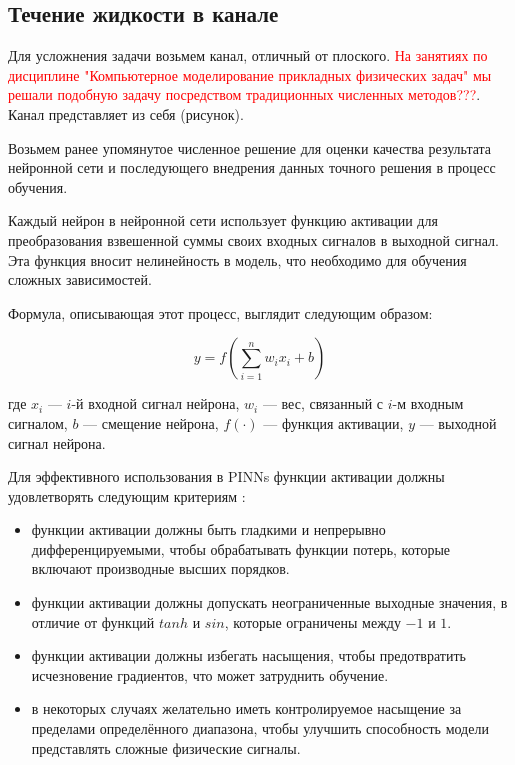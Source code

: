 \subsection{Течение жидкости в канале}
Для усложнения задачи возьмем канал, отличный от плоского. \textcolor{red}{На занятиях
по дисциплине "Компьютерное моделирование прикладных физических задач" мы решали подобную
задачу посредством традиционных численных методов???}. Канал представляет из себя (рисунок).

Возьмем ранее упомянутое численное решение для оценки качества результата нейронной сети и
последующего внедрения данных точного решения в процесс обучения.



Каждый нейрон в нейронной сети использует функцию активации для преобразования взвешенной
суммы своих входных сигналов в выходной сигнал. Эта функция вносит нелинейность в модель,
что необходимо для обучения сложных зависимостей.

Формула, описывающая этот процесс, выглядит следующим образом:

$$y = f(\sum_{i=1}^{n} w_i x_i + b)$$

где $x_i$ — $i$-й входной сигнал нейрона, $w_i$ — вес, связанный с $i$-м входным сигналом, $b$
— смещение нейрона, $f(\cdot)$ — функция активации, $y$ — выходной сигнал нейрона.

Для эффективного использования в PINNs функции активации должны удовлетворять следующим
критериям \cite{0d752c79fb816703274a3d37f85a85689a2a9405}:
\begin{itemize}
    \item функции активации должны быть гладкими и
    непрерывно дифференцируемыми, чтобы обрабатывать функции потерь, которые включают
    производные высших порядков.
    \item функции активации должны допускать неограниченные
    выходные значения, в отличие от функций $tanh$ и $sin$, которые ограничены между $-1$ и $1$.
    \item функции активации должны избегать насыщения, чтобы предотвратить
    исчезновение градиентов, что может затруднить обучение.
    \item в некоторых случаях желательно иметь контролируемое насыщение за пределами определённого
    диапазона, чтобы улучшить способность модели представлять сложные физические сигналы.
\end{itemize}


